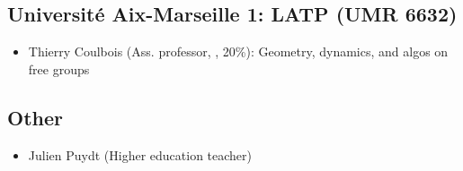 \vspace{-1.2ex}
\subsection*{Université Aix-Marseille 1: LATP (UMR 6632)}
\begin{itemize}
\item Thierry Coulbois (Ass. professor, \MATH, 20\%):
  Geometry, dynamics, and algos on free groups
\end{itemize}

\subsection*{Other}

\begin{itemize}
\item Julien Puydt (Higher education teacher)
\end{itemize}
